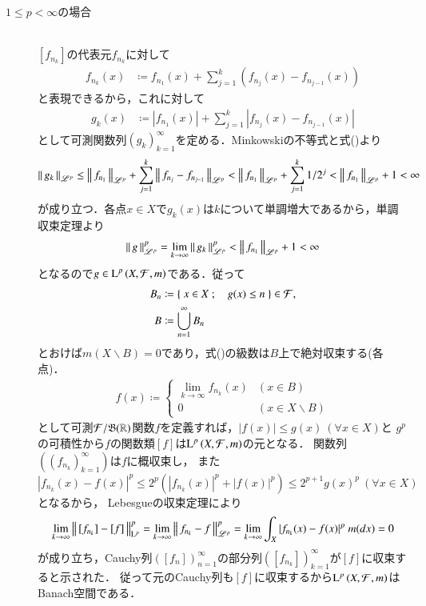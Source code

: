 \begin{prf}
\begin{description}
		\item[$1 \leq p < \infty$の場合]\mbox{}\\
			$[f_{n_k}]$の代表元$f_{n_k}$に対して
			\begin{align}	
				f_{n_k}(x) &\coloneqq f_{n_1}(x) + \sum_{j=1}^{k}(f_{n_j}(x) - f_{n_{j-1}}(x)) \label{eq:Lp_banach_3}
			\end{align}
			と表現できるから，これに対して
			\begin{align}
				g_k(x) &\coloneqq |f_{n_1}(x)| + \sum_{j=1}^{k}|f_{n_j}(x) - f_{n_{j-1}}(x)|
			\end{align}
			として可測関数列$(g_k)_{k=1}^{\infty}$を定める．Minkowskiの不等式と式()より
			\begin{align}
				\left\|\, g_k\, \right\|_{\mathscr{L}^p} \leq \left\|\, f_{n_1}\, \right\|_{\mathscr{L}^p} + \sum_{j=1}^{k}\left\|\, f_{n_j} - f_{n_{j-1}}\, \right\|_{\mathscr{L}^p}
				< \left\|\, f_{n_1}\, \right\|_{\mathscr{L}^p} + \sum_{j=1}^{k} 1/2^j < \left\|\, f_{n_1}\, \right\|_{\mathscr{L}^p} + 1 < \infty
			\end{align}
			が成り立つ．各点$x \in X$で$g_k(x)$は$k$について単調増大であるから，単調収束定理より
			\begin{align}
				\left\|\, g\, \right\|_{\mathscr{L}^p}^p = \lim_{k \to \infty} \left\|\, g_k\, \right\|_{\mathscr{L}^p}^p < \left\|\, f_{n_1}\, \right\|_{\mathscr{L}^p} + 1 < \infty
			\end{align}
			となるので$g \in \operatorname{L}^{p} \left(X,\mathcal{F},m\right)$である．従って
			\begin{align}
				B_n &\coloneqq \left\{\ x \in X\ ;\quad g(x) \leq n\ \right\} \in \mathcal{F}, \\
				B &\coloneqq \bigcup_{n=1}^{\infty} B_n
			\end{align}
			とおけば$m(X \backslash B) = 0$であり，式()の級数は$B$上で絶対収束する(各点)．
			\begin{align}
				f(x) \coloneqq
				\begin{cases}
					\lim\limits_{k \to \infty} f_{n_k}(x) & (x \in B) \\
					0 & (x \in X \backslash B)
				\end{cases}
			\end{align}
			として可測$\mathcal{F}/\mathfrak{B}(\mathbb{R})$関数$f$を定義すれば，$|f(x)| \leq g(x)\ (\forall x \in X)$と
			$g^p$の可積性から$f$の関数類$[f]$は$\operatorname{L}^{p} \left(X,\mathcal{F},m\right)$の元となる．
			関数列$(\left( f_{n_k} \right)_{k=1}^{\infty})$は$f$に概収束し，
			また$|f_{n_k}(x) - f(x)|^p \leq 2^p(|f_{n_k}(x)|^p + |f(x)|^p) \leq 2^{p+1} g(x)^p\ (\forall x \in X)$となるから，
			Lebesgueの収束定理により
			\begin{align}
				\lim_{k \to \infty}\Norm{[f_{n_k}] - [f]}{\mathrm{L}^p}^p
				= \lim_{k \to \infty}\Norm{f_{n_k} - f}{\mathscr{L}^p}^p
				= \lim_{k \to \infty} \int_X |f_{n_k}(x) - f(x)|^p\ m(dx) = 0
			\end{align}
			が成り立ち，Cauchy列$\left( [f_{n}] \right)_{n=1}^{\infty}$の部分列$\left( [f_{n_k}] \right)_{k=1}^{\infty}$が$[f]$に収束すると示された．
			従って元のCauchy列も$[f]$に収束するから$\operatorname{L}^{p} \left(X,\mathcal{F},m\right)$はBanach空間である．
			\QED
	\end{description}
\end{prf}
